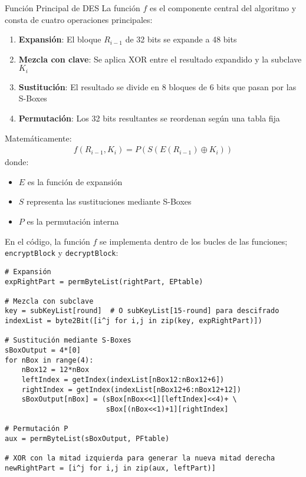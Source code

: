 \begin{cryptoanalysis}{Función Principal de DES}
La función $f$ es el componente central del algoritmo y consta de cuatro operaciones principales:
\begin{enumerate}
    \item \textbf{Expansión}: El bloque $R_{i-1}$ de 32 bits se expande a 48 bits
    \item \textbf{Mezcla con clave}: Se aplica XOR entre el resultado expandido y la subclave $K_i$
    \item \textbf{Sustitución}: El resultado se divide en 8 bloques de 6 bits que pasan por las S-Boxes
    \item \textbf{Permutación}: Los 32 bits resultantes se reordenan según una tabla fija
\end{enumerate}

Matemáticamente:
\begin{align}
f(R_{i-1}, K_i) = P(S(E(R_{i-1}) \oplus K_i))
\end{align}
donde:
\begin{itemize}
    \item $E$ es la función de expansión
    \item $S$ representa las sustituciones mediante S-Boxes
    \item $P$ es la permutación interna
\end{itemize}
\end{cryptoanalysis}

En el código, la función $f$ se implementa dentro de los bucles de las funciones;\\ \texttt{encryptBlock} y \texttt{decryptBlock}:

\begin{lstlisting}[style=cryptoalgo]
# Expansión
expRightPart = permByteList(rightPart, EPtable)

# Mezcla con subclave
key = subKeyList[round]  # O subKeyList[15-round] para descifrado
indexList = byte2Bit([i^j for i,j in zip(key, expRightPart)])

# Sustitución mediante S-Boxes
sBoxOutput = 4*[0]
for nBox in range(4):
    nBox12 = 12*nBox
    leftIndex = getIndex(indexList[nBox12:nBox12+6])
    rightIndex = getIndex(indexList[nBox12+6:nBox12+12])
    sBoxOutput[nBox] = (sBox[nBox<<1][leftIndex]<<4)+ \
                        sBox[(nBox<<1)+1][rightIndex]

# Permutación P
aux = permByteList(sBoxOutput, PFtable)

# XOR con la mitad izquierda para generar la nueva mitad derecha
newRightPart = [i^j for i,j in zip(aux, leftPart)]
\end{lstlisting}


